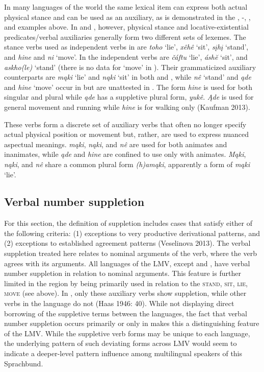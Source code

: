 \documentclass[output=paper]{LSP/langsci}
\begin{document}
In many languages of the world the same lexical item can express both actual physical stance and can be used as an auxiliary, as is demonstrated in the , -, , and  examples above. In  and , however, physical stance and locative-existential predicates/verbal auxiliaries generally form two different sets of lexemes. The stance verbs used as independent verbs in  are \emph{toho} `lie', \emph{xêhê} `sit', \emph{sįhį} `stand', and \emph{hine} and \emph{ni} `move'. In  the independent verbs are \emph{čáftu} `lie', \emph{áshĕ} `sit', and \emph{askho(le)} `stand' (there is no data for `move' in ). Their grammaticized auxiliary counterparts are \emph{mąki} `lie' and \emph{nąki} `sit' in both  and , while \emph{nê} `stand' and \emph{ąde} and \emph{hine} `move' occur in  but are unattested in . The  form \emph{hine} is used for both singular and plural while \emph{ąde} has a suppletive plural form, \emph{yukê}. \emph{Ąde} is used for general movement and running while \emph{hine} is for walking only (Kaufman 2013). 

These verbs form a discrete set of auxiliary verbs that often no longer specify actual physical position or movement but, rather, are used to express nuanced aspectual meanings.  \emph{mąki}, \emph{nąki}, and \emph{nê} are used for both animates and inanimates, while \emph{ąde} and \emph{hine} are confined to use only with animates. \emph{Mąki}, \emph{nąki}, and \emph{nê} share a common plural form \emph{(h)amąki}, apparently a form of \emph{mąki} `lie'. 
 
\subsection{Verbal number suppletion}

	For this section, the definition of suppletion includes cases that satisfy either of the following criteria: (1) exceptions to very productive derivational patterns, and (2) exceptions to established agreement patterns (Veselinova 2013). The verbal suppletion treated here relates to nominal arguments of the verb, where the verb agrees with its arguments. All languages of the LMV, except  and , have verbal number suppletion in relation to nominal arguments. This feature is further limited in the region by being primarily used in relation to the  \textsc{stand}, \textsc{sit}, \textsc{lie}, \textsc{move} (see above). In , only these auxiliary verbs show suppletion, while other verbs in the language do not (Haas 1946: 40). While not displaying direct borrowing of the suppletive terms between the languages, the fact that verbal number suppletion occurs primarily or only in  makes this a distinguishing feature of the LMV. While the suppletive verb forms may be unique to each language, the underlying pattern of such deviating forms across LMV  would seem to indicate a deeper-level pattern influence among multilingual speakers of this Sprachbund.
\end{document}
